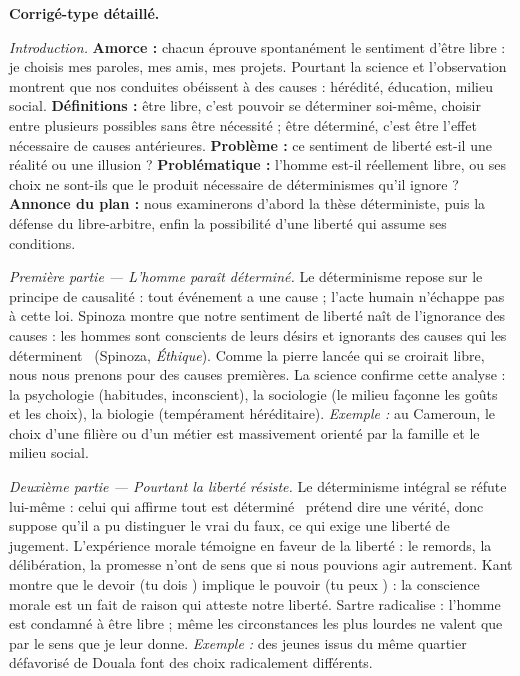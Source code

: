 \documentclass[11pt]{article}
\begin{document}
\begin{corrige}
\textbf{Corrigé-type détaillé.}

\emph{Introduction.} \textbf{Amorce :} chacun éprouve spontanément le sentiment d'être libre : je choisis mes paroles, mes amis, mes projets. Pourtant la science et l'observation montrent que nos conduites obéissent à des causes : hérédité, éducation, milieu social. \textbf{Définitions :} être libre, c'est pouvoir se déterminer soi-même, choisir entre plusieurs possibles sans être nécessité ; être déterminé, c'est être l'effet nécessaire de causes antérieures. \textbf{Problème :} ce sentiment de liberté est-il une réalité ou une illusion ? \textbf{Problématique :} l'homme est-il réellement libre, ou ses choix ne sont-ils que le produit nécessaire de déterminismes qu'il ignore ? \textbf{Annonce du plan :} nous examinerons d'abord la thèse déterministe, puis la défense du libre-arbitre, enfin la possibilité d'une liberté qui assume ses conditions.

\emph{Première partie — L'homme paraît déterminé.} Le déterminisme repose sur le principe de causalité : tout événement a une cause ; l'acte humain n'échappe pas à cette loi. Spinoza montre que notre sentiment de liberté naît de l'ignorance des causes : \guillemotleft les hommes sont conscients de leurs désirs et ignorants des causes qui les déterminent \guillemotright\ (Spinoza, \emph{Éthique}). Comme la pierre lancée qui se croirait libre, nous nous prenons pour des causes premières. La science confirme cette analyse : la psychologie (habitudes, inconscient), la sociologie (le milieu façonne les goûts et les choix), la biologie (tempérament héréditaire). \emph{Exemple :} au Cameroun, le choix d'une filière ou d'un métier est massivement orienté par la famille et le milieu social.

\emph{Deuxième partie — Pourtant la liberté résiste.} Le déterminisme intégral se réfute lui-même : celui qui affirme \guillemotleft tout est déterminé \guillemotright\ prétend dire une vérité, donc suppose qu'il a pu distinguer le vrai du faux, ce qui exige une liberté de jugement. L'expérience morale témoigne en faveur de la liberté : le remords, la délibération, la promesse n'ont de sens que si nous pouvions agir autrement. Kant montre que le devoir (\guillemotleft tu dois \guillemotright) implique le pouvoir (\guillemotleft tu peux \guillemotright) : la conscience morale est un fait de raison qui atteste notre liberté. Sartre radicalise : l'homme est \guillemotleft condamné à être libre \guillemotright ; même les circonstances les plus lourdes ne valent que par le sens que je leur donne. \emph{Exemple :} des jeunes issus du même quartier défavorisé de Douala font des choix radicalement différents.


\end{corrige}
\end{document}
